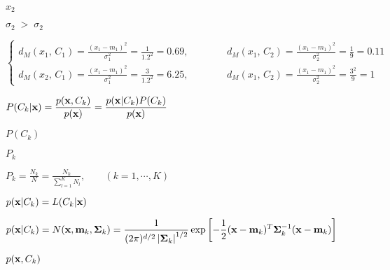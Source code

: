 \documentclass{article}
\def\lthtmlcheckvsize{\ifdim\ht\sizebox<\vsize 
  \ifdim\wd\sizebox<\hsize\expandafter\hfill\fi \expandafter\vfill
  \else\expandafter\vss\fi}%
\begin{document}
{\newpage\clearpage
{}%
$ x_2$%
\lthtmlindisplaymathZ
\lthtmlcheckvsize\clearpage}

{\newpage\clearpage
{}%
$ \sigma_2\;> \;\sigma_2$%
\lthtmlindisplaymathZ
\lthtmlcheckvsize\clearpage}

{\newpage\clearpage
{}%
\begin{displaymath}\left\{
\begin{array}{l}
d_M(x_1,\,C_1)=\frac{(x_1-m_1)^2}{\sigma_1^2}=\frac{1}{1.2^2}=0.69,
\;\;\;\;\;\;\;\;\;\;\;\;\;\;
d_M(x_1,\,C_2)=\frac{(x_1-m_1)^2}{\sigma_2^2}=\frac{1}{9}=0.11\\
d_M(x_2,\,C_1)=\frac{(x_1-m_1)^2}{\sigma_1^2}=\frac{3}{1.2^2}=6.25,
\;\;\;\;\;\;\;\;\;\;\;\;\;\;
d_M(x_1,\,C_2)=\frac{(x_1-m_1)^2}{\sigma_2^2}=\frac{3^2}{9}=1
\end{array}\right.\end{displaymath}%
\lthtmldisplayZ
\lthtmlcheckvsize\clearpage}

{\newpage\clearpage
{}%
$\displaystyle P(C_k|{\bf x})=\frac{p({\bf x},C_k)}{p({\bf x})}
=\frac{p({\bf x}|C_k)P(C_k)}{p({\bf x})}$%
\lthtmlindisplaymathZ
\lthtmlcheckvsize\clearpage}

{\newpage\clearpage
{}%
$ P(C_k)$%
\lthtmlindisplaymathZ
\lthtmlcheckvsize\clearpage}

{\newpage\clearpage
{}%
$ P_k$%
\lthtmlindisplaymathZ
\lthtmlcheckvsize\clearpage}

{\newpage\clearpage
{}%
$\displaystyle P_k=\frac{N_k}{N}=\frac{N_k}{\sum_{l=1}^K N_l},
\;\;\;\;\;\;\;(k=1,\cdots,K)$%
\lthtmlindisplaymathZ
\lthtmlcheckvsize\clearpage}

{\newpage\clearpage
{}%
$ p({\bf x}|C_k)=L(C_k|{\bf x})$%
\lthtmlindisplaymathZ
\lthtmlcheckvsize\clearpage}

{\newpage\clearpage
{}%
$\displaystyle p({\bf x}|C_k)=N({\bf x},{\bf m}_k,{\bf\Sigma}_k)
=\frac{1}{(2\pi)^{d/2} \left| {\bf\Sigma}_k\right|^{1/2}}
\exp\left[-\frac{1}{2}({\bf x}-{\bf m}_k)^T{\bf\Sigma}_k^{-1}
({\bf x}-{\bf m}_k)\right]$%
\lthtmlindisplaymathZ
\lthtmlcheckvsize\clearpage}

{\newpage\clearpage
{}%
$ p({\bf x},C_k)$%
\lthtmlindisplaymathZ
\lthtmlcheckvsize\clearpage}
\end{document}
